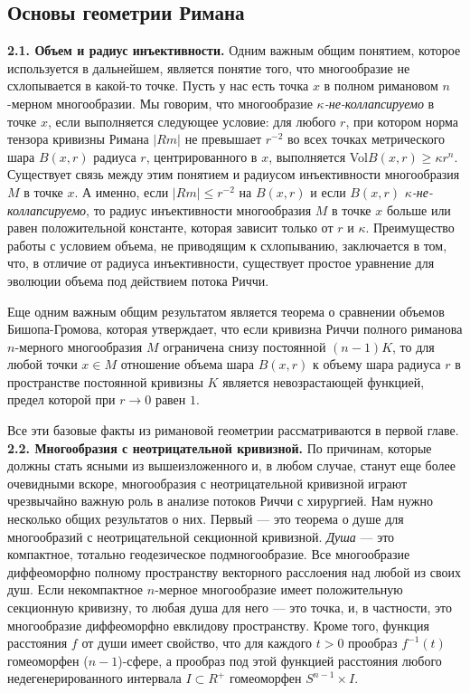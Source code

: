 \subsection{Основы геометрии Римана}

\textbf{2.1. Объем и радиус инъективности.} Одним важным общим понятием, которое 
используется в дальнейшем, является понятие того, что многообразие не схлопывается 
в какой-то точке. Пусть у нас есть точка $x$ в полном римановом $n$-мерном многообразии. 
Мы говорим, что многообразие \textit{$\kappa $-не-коллапсируемо} в точке $x$, если 
выполняется следующее условие: для любого $r$, при котором норма тензора кривизны Римана
$| Rm| $ не превышает $r^{-2}$ во всех точках метрического шара $B(x,r)$ радиуса $r$, центрированного 
в $x$, выполняется Vol$B(x,r)\geq \kappa r^{n}$. Существует связь между этим понятием и радиусом 
инъективности многообразия $M$ в точке $x$. А именно, если $| Rm| \leq r^{-2}$ на $B(x,r)$ и если 
$B(x,r)$ \textit{$\kappa $-не-коллапсируемо}, то радиус инъективности многообразия $M$ в точке 
$x$ больше или равен положительной константе, которая зависит только от $r$ и $\kappa $. 
Преимущество работы с условием объема, не приводящим к схлопыванию, заключается в том, 
что, в отличие от радиуса инъективности, существует простое уравнение для эволюции объема 
под действием потока Риччи.

Еще одним важным общим результатом является теорема о сравнении объемов Бишопа-Громова, 
которая утверждает, что если кривизна Риччи полного риманова $n$-мерного многообразия $M$ 
ограничена снизу постоянной $(n-1)K$, то для любой точки $x\in M$ отношение объема шара 
$B(x,r)$ к объему шара радиуса $r$ в пространстве постоянной кривизны $K$ является 
невозрастающей функцией, предел которой при $r\rightarrow 0$ равен $1$. 

Все эти базовые факты из римановой геометрии рассматриваются в первой главе.\\


\textbf{2.2. Многообразия с неотрицательной кривизной.} По причинам, которые должны стать 
ясными из вышеизложенного и, в любом случае, станут еще более очевидными вскоре, 
многообразия с неотрицательной кривизной играют чрезвычайно важную роль в анализе 
потоков Риччи с хирургией. Нам нужно несколько общих результатов о них. 
Первый — это теорема о душе для многообразий с неотрицательной секционной кривизной. 
\textit{Душа} — это компактное, тотально геодезическое подмногообразие. Все многообразие 
диффеоморфно полному пространству векторного расслоения над любой из своих душ. 
Если некомпактное $n$-мерное многообразие имеет положительную секционную кривизну, 
то любая душа для него — это точка, и, в частности, это многообразие диффеоморфно 
евклидову пространству. Кроме того, функция расстояния $f$ от души имеет свойство, 
что для каждого $t > 0$ прообраз $f^{-1} (t)$ гомеоморфен ($n-1$)-сфере, а прообраз под 
этой функцией расстояния любого недегенерированного интервала $I\subset R^{+}$ гомеоморфен 
$S^{n-1} \times I$.